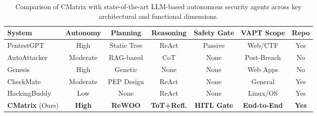 
\begin{table}[htbp]
  \centering
  \caption{Comparison of CMatrix with state-of-the-art LLM-based autonomous security agents across key architectural and functional dimensions.}
  \label{tab:related-work-comparison}
  \begin{tabular}{lcccccc}
    \toprule
    \textbf{System} & \textbf{Autonomy} & \textbf{Planning} & \textbf{Reasoning} & \textbf{Safety Gate} & \textbf{VAPT Scope} & \textbf{Repo} \\
    \midrule
    PentestGPT \cite{pentestgpt} & High & Static Tree & ReAct & Passive & Web/CTF & Yes \\
    AutoAttacker \cite{autoattacker} & Moderate & RAG-based & CoT & None & Post-Breach & No \\
    Genesis \cite{genesis} & High & Genetic & None & None & Web Apps & No \\
    CheckMate \cite{checkmate} & Moderate & PEP Design & ReAct & None & General & Yes \\
    HackingBuddy \cite{hackingbuddy} & Low & None & ReAct & None & Linux/OS & Yes \\
    \midrule
    \textbf{CMatrix} (Ours) & \textbf{High} & \textbf{ReWOO} & \textbf{ToT+Refl.} & \textbf{HITL Gate} & \textbf{End-to-End} & \textbf{Yes} \\
    \bottomrule
  \end{tabular}
\end{table}
